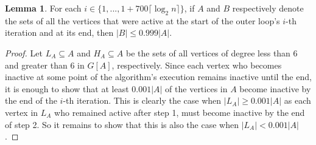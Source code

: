 \documentclass{article}
\theoremstyle{definition}
\newtheorem{lemma}{Lemma}[section]
\begin{document}
\begin{lemma} For each $i \in \{1,...,1+700\lceil\log_{2}n\rceil\}$, if $A$ and $B$ respectively denote the sets of all the vertices that were active at the start of the outer loop's $i$-th iteration and at its end, then $|B| \le 0.999|A|$.\label{lem:numberOfVerticesDeactivates6}\end{lemma}

\begin{proof}Let $L_A \subseteq A$ and $H_A \subseteq A$ be the sets of all vertices of degree less than $6$ and greater than $6$ in $G[A]$, respectively. Since each vertex who becomes inactive at some point of the algorithm's execution remains inactive until the end, it is enough to show that at least $0.001|A|$ of the vertices in $A$ become inactive by the end of the $i$-th iteration. This is clearly the case when $|L_A| \ge 0.001|A|$ as each vertex in $L_A$ who remained active after step 1, must become inactive by the end of step 2. So it remains to show that this is also the case when $|L_A| < 0.001|A|$.


\end{proof}
\end{document}
